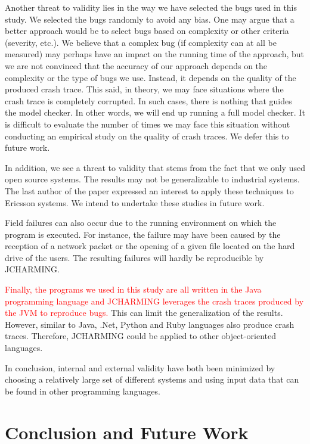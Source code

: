 \documentclass[times, doublespace]{smrauth}
\newcommand{\red}[1]{\textcolor{red}{#1}}
\begin{document}
Another threat to validity lies in the way we have selected the
bugs used in this study. We selected the bugs randomly to
avoid any bias. One may argue that a better approach would
be to select bugs based on complexity or other criteria
(severity, etc.). We believe that a complex bug (if complexity
can at all be measured) may perhaps have an impact on the
running time of the approach, but we are not convinced that
the accuracy of our approach depends on the complexity or the
type of bugs we use. Instead, it depends on the quality of the
produced crash trace. This said, in theory, we may face situations where the crash trace is completely corrupted. In such cases, there is nothing that guides the model checker. In other words, we will end up
running a full model checker. It is difficult to evaluate the number of times we may face this situation without conducting an empirical study on the quality of crash traces. We defer this to future work.

In addition, we see a threat to validity that stems from the fact
that we only used open source systems. The results may not be
generalizable to industrial systems. The last author of the
paper expressed an interest to apply these techniques to
Ericsson systems. We intend to undertake these studies in
future work.

Field failures can also occur due to the running environment
on which the program is executed. For instance, the failure
may have been caused by the reception of a network packet or
the opening of a given file located on the hard drive of the
users. The resulting failures will hardly be reproducible by
JCHARMING.

\red{Finally, the programs we used in this study are all written in
the Java programming language and JCHARMING leverages
the crash traces produced by the JVM to reproduce bugs.} This
can limit the generalization of the results. However, similar to
Java, .Net, Python and Ruby languages also produce crash
traces. Therefore, JCHARMING could be applied to other
object-oriented languages.

In conclusion, internal and external validity have both been
minimized by choosing a relatively large set of different
systems and using input data that can be found in other
programming languages.

\section{Conclusion and Future Work\label{sec:conclusion}}
\end{document}
